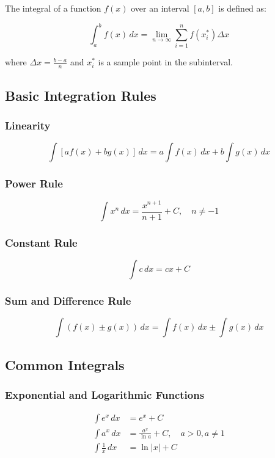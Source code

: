 \documentclass[../Main.tex]{subfiles}
\begin{document}
The integral of a function $f(x)$ over an interval $[a,b]$ is defined as:

\begin{equation}
\int_a^b f(x) \, dx = \lim_{n \to \infty} \sum_{i=1}^{n} f(x_i^*) \Delta x
\end{equation}

where $\Delta x = \frac{b-a}{n}$ and $x_i^*$ is a sample point in the subinterval.

\subsection{Basic Integration Rules}

\subsubsection{Linearity}
\begin{equation}
\int [af(x) + bg(x)] \, dx = a \int f(x) \, dx + b \int g(x) \, dx
\end{equation}

\subsubsection{Power Rule}
\begin{equation}
\int x^n \, dx = \frac{x^{n+1}}{n+1} + C, \quad n \neq -1
\end{equation}

\subsubsection{Constant Rule}
\begin{equation}
\int c \, dx = cx + C
\end{equation}

\subsubsection{Sum and Difference Rule}
\begin{equation}
\int (f(x) \pm g(x)) \, dx = \int f(x) \, dx \pm \int g(x) \, dx
\end{equation}

\subsection{Common Integrals}

\subsubsection{Exponential and Logarithmic Functions}
\begin{align}
\int e^x \, dx &= e^x + C \\
\int a^x \, dx &= \frac{a^x}{\ln a} + C, \quad a > 0, a \neq 1 \\
\int \frac{1}{x} \, dx &= \ln |x| + C
\end{align}
\end{document}
